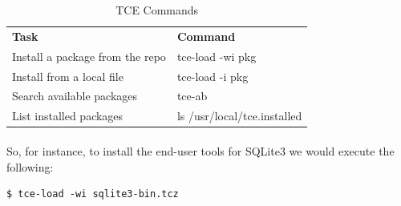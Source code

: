 \documentclass[12pt, a4paper, twoside]{book}
\begin{document}
\begin{table}
    \begin{tabular}{ll}
    {\bf Task}                          & {\bf Command} \\
    Install a package from the repo     & tce-load -wi pkg \\
    Install from a local file           & tce-load -i pkg \\
    Search available packages	        & tce-ab \\
    List installed packages             & ls /usr/local/tce.installed \\
    \end{tabular}
    \caption {TCE Commands}
    \label{key-table}
\end{table}

\paragraph{} So, for instance, to install the end-user tools for SQLite3 we would execute the following:

\begin{lstlisting}[style=DOS]
    $ tce-load -wi sqlite3-bin.tcz
\end{lstlisting}

\backmatter




\end{document}
